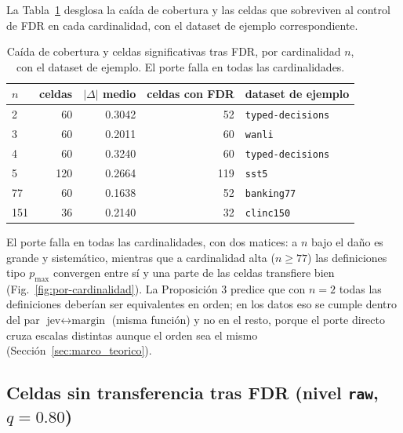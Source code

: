La Tabla~\ref{tab:cardinalidad-fdr} desglosa la caída de cobertura y las celdas que sobreviven al control de
FDR en cada cardinalidad, con el dataset de ejemplo correspondiente.

\begin{table}[t]
\centering
\caption{Caída de cobertura y celdas significativas tras FDR, por cardinalidad $n$, con el dataset de
ejemplo. El porte falla en todas las cardinalidades.}
\label{tab:cardinalidad-fdr}
{\footnotesize
\setlength{\tabcolsep}{3pt}
\begin{tabular}{lrrrl}
\toprule
$n$ & celdas & $\lvert\Delta\rvert$ medio & celdas con FDR & dataset de ejemplo \\
\midrule
2 & 60 & 0.3042 & 52 & \texttt{typed-\allowbreak decisions} \\
3 & 60 & 0.2011 & 60 & \texttt{wanli} \\
4 & 60 & 0.3240 & 60 & \texttt{typed-\allowbreak decisions} \\
5 & 120 & 0.2664 & 119 & \texttt{sst5} \\
77 & 60 & 0.1638 & 52 & \texttt{banking77} \\
151 & 36 & 0.2140 & 32 & \texttt{clinc150} \\
\bottomrule
\end{tabular}}
\end{table}

El porte falla en todas las cardinalidades, con dos matices: a $n$ bajo el daño es grande y sistemático,
mientras que a cardinalidad alta ($n \ge 77$) las definiciones tipo $p_{\max}$ convergen entre sí y una parte
de las celdas transfiere bien (Fig.~\ref{fig:por-cardinalidad}). La Proposición 3 predice que con $n = 2$
todas las definiciones deberían ser equivalentes en orden; en los datos eso se cumple dentro del par
$\text{jev} \leftrightarrow \text{margin}$ (misma función) y no en el resto, porque el porte directo cruza
escalas distintas aunque el orden sea el mismo (Sección~\ref{sec:marco_teorico}).

\subsection{Celdas sin transferencia tras FDR (nivel \texttt{raw}, $q = 0.80$)}

